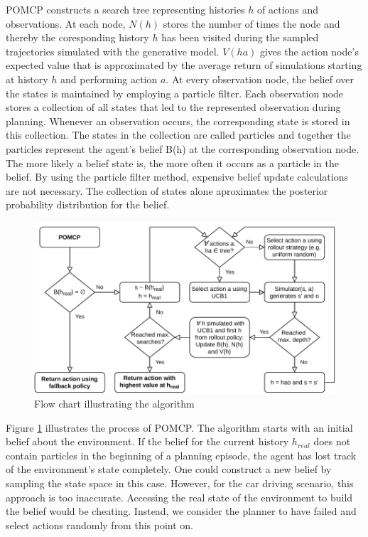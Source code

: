 
POMCP constructs a search tree representing histories $h$ of actions and observations. At each node, $N(h)$ stores the number of times the node and thereby the coresponding history $h$ has been visited during the sampled trajectories simulated with the generative model. $V(ha)$ gives the action node's expected value that is approximated by the average return of simulations starting at history $h$ and performing action $a$. At every observation node, the belief over the states is maintained by employing a particle filter. Each observation node stores a collection of all states that led to the represented observation during planning. Whenever an observation occurs, the corresponding state is stored in this collection. The states in the collection are called particles and together the particles represent the agent's belief B(h) at the corresponding observation node. The more likely a belief state is, the more often it occurs as a particle in the belief. By using the particle filter method, expensive belief update calculations are not necessary. The collection of states alone aproximates the posterior probability distribution for the belief.

\begin{figure}[htbp]
    \centerfloat
    \includegraphics[width=1.0\textwidth]{figures/POMCP.pdf}
    \caption{Flow chart illustrating the  algorithm}
    \label{fig:pomcp}
\end{figure}

Figure \ref{fig:pomcp} illustrates the process of POMCP. The algorithm starts with an initial belief about the environment. If the belief for the current history $h_{real}$ does not contain particles in the beginning of a planning episode, the agent has lost track of the environment's state completely. One could construct a new belief by sampling the state space in this case. However, for the car driving scenario, this approach is too inaccurate. Accessing the real state of the environment to build the belief would be cheating. Instead, we consider the planner to have failed and select actions randomly from this point on.


